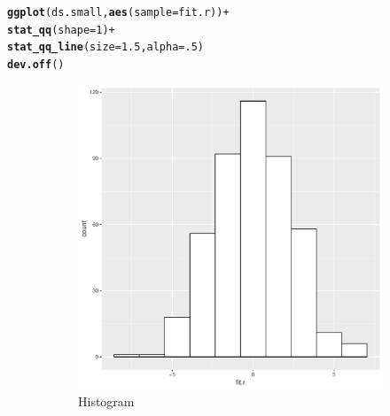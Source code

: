 \documentclass[11pt,openany]{book}
\makeatletter
\newcommand{\hlnum}[1]{\textcolor[rgb]{0.686,0.059,0.569}{#1}}%
\newcommand{\hlopt}[1]{\textcolor[rgb]{0,0,0}{#1}}%
\newcommand{\hlstd}[1]{\textcolor[rgb]{0.345,0.345,0.345}{#1}}%
\newcommand{\hlkwc}[1]{\textcolor[rgb]{0.333,0.667,0.333}{#1}}%
\newcommand{\hlkwd}[1]{\textcolor[rgb]{0.737,0.353,0.396}{\textbf{#1}}}%
\newenvironment{kframe}{%
 \def\at@end@of@kframe{}%
 \ifinner\ifhmode%
  \def\at@end@of@kframe{\end{minipage}}%
  \begin{minipage}{\columnwidth}%
 \fi\fi%
 \def\FrameCommand##1{\hskip\@totalleftmargin \hskip-\fboxsep
 \colorbox{shadecolor}{##1}\hskip-\fboxsep
     \hskip-\linewidth \hskip-\@totalleftmargin \hskip\columnwidth}%
 \MakeFramed {\advance\hsize-\width
   \@totalleftmargin\z@ \linewidth\hsize
   \@setminipage}}%
 {\par\unskip\endMakeFramed%
 \at@end@of@kframe}
\newenvironment{knitrout}{}{} %
\renewenvironment{knitrout}{\begin{singlespace}}{\end{singlespace}}
\makeatother
\begin{document}
\begin{knitrout}
\color{fgcolor}\begin{kframe}
\begin{alltt}
\hlkwd{ggplot}\hlstd{(ds.small,} \hlkwd{aes}\hlstd{(}\hlkwc{sample} \hlstd{= fit.r))} \hlopt{+}
  \hlkwd{stat_qq}\hlstd{(}\hlkwc{shape} \hlstd{=} \hlnum{1}\hlstd{)} \hlopt{+}
  \hlkwd{stat_qq_line}\hlstd{(}\hlkwc{size} \hlstd{=} \hlnum{1.5}\hlstd{,} \hlkwc{alpha} \hlstd{=} \hlnum{.5}\hlstd{)}
\hlkwd{dev.off}\hlstd{()}
\end{alltt}
\end{kframe}
\end{knitrout}

\begin{figure}
        \centering
        \begin{subfigure}[b]{0.4\textwidth}
                \centering
                \includegraphics[width=\textwidth]{../15_Diagnostics/multresidhist.pdf} %
                \caption{Histogram \label{fig:multresidhist}}
        \end{subfigure}
        \begin{subfigure}[b]{0.4\textwidth}
                \centering

\end{subfigure}
\end{figure}
\end{document}
